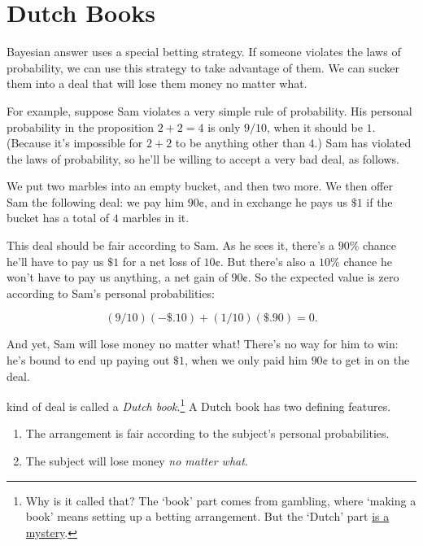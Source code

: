 \documentclass[justified]{tufte-book}
\providecommand{\tightlist}{%
  \setlength{\itemsep}{0pt}\setlength{\parskip}{0pt}}
\theoremstyle{definition}
\theoremstyle{definition}
\theoremstyle{definition}
\theoremstyle{remark}
\begin{document}
\hypertarget{dutch-books-1}{%
\section{Dutch Books}\label{dutch-books-1}}

 Bayesian answer uses a special betting strategy. If
someone violates the laws of probability, we can use this strategy to
take advantage of them. We can sucker them into a deal that will lose
them money no matter what.

For example, suppose Sam violates a very simple rule of probability. His
personal probability in the proposition \(2+2=4\) is only \(9/10\), when
it should be \(1\). (Because it's impossible for \(2+2\) to be anything
other than \(4\).) Sam has violated the laws of probability, so he'll be
willing to accept a very bad deal, as follows.

We put two marbles into an empty bucket, and then two more. We then
offer Sam the following deal: we pay him \(90\)¢, and in exchange he
pays us \(\$1\) if the bucket has a total of \(4\) marbles in it.

This deal should be fair according to Sam. As he sees it, there's a
\(90\%\) chance he'll have to pay us \(\$1\) for a net loss of \(10\)¢.
But there's also a \(10\%\) chance he won't have to pay us anything, a
net gain of \(90\)¢. So the expected value is zero according to Sam's
personal probabilities:

\[ (9/10)(-\$.10) + (1/10)(\$.90) = 0. \]

And yet, Sam will lose money no matter what! There's no way for him to
win: he's bound to end up paying out \(\$1\), when we only paid him
\(90\)¢ to get in on the deal.

 kind of deal is called a \emph{Dutch book}.\footnote{Why
  is it called that? The `book' part comes from gambling, where `making
  a book' means setting up a betting arrangement. But the `Dutch' part
  \href{https://personal.eur.nl/wakker/miscella/dutchbk.htm}{is a
  mystery}.} A Dutch book has two defining features.

\begin{enumerate}
\def\labelenumi{\arabic{enumi}.}
\tightlist
\item
  The arrangement is fair according to the subject's personal
  probabilities.
\item
  The subject will lose money \emph{no matter what}.
\end{enumerate}
\end{document}
